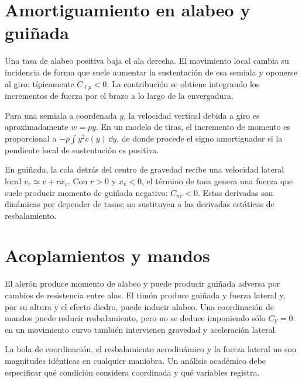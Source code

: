 \section{Amortiguamiento en alabeo y guiñada}
Una tasa de alabeo positiva baja el ala derecha. El movimiento local cambia su incidencia de forma que suele aumentar la sustentación de esa semiala y oponerse al giro: típicamente $C_{\ell p}<0$. La contribución se obtiene integrando los incrementos de fuerza por el brazo a lo largo de la envergadura.

Para una semiala a coordenada $y$, la velocidad vertical debida a giro es aproximadamente $w=py$. En un modelo de tiras, el incremento de momento es proporcional a $-p\int y^2c(y)\,\dd y$, de donde procede el signo amortiguador si la pendiente local de sustentación es positiva.

En guiñada, la cola detrás del centro de gravedad recibe una velocidad lateral local $v_v\simeq v+rx_v$. Con $r>0$ y $x_v<0$, el término de tasa genera una fuerza que suele producir momento de guiñada negativo: $C_{nr}<0$. Estas derivadas son dinámicas por depender de tasas; no sustituyen a las derivadas estáticas de resbalamiento.

\section{Acoplamientos y mandos}
El alerón produce momento de alabeo y puede producir guiñada adversa por cambios de resistencia entre alas. El timón produce guiñada y fuerza lateral y, por su altura y el efecto diedro, puede inducir alabeo. Una coordinación de mandos puede reducir resbalamiento, pero no se deduce imponiendo sólo $C_Y=0$: en un movimiento curvo también intervienen gravedad y aceleración lateral.

La bola de coordinación, el resbalamiento aerodinámico y la fuerza lateral no son magnitudes idénticas en cualquier maniobra. Un análisis académico debe especificar qué condición considera coordinada y qué variables registra.


